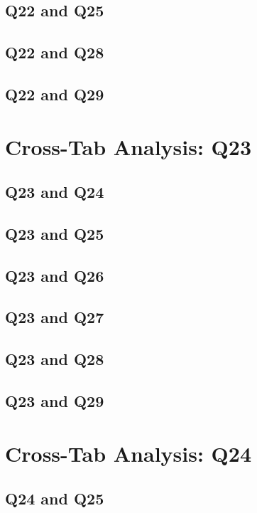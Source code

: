 \documentclass{report}
\begin{document}
\section{Q22 and Q25}\clearpage
\section{Q22 and Q28}\clearpage
\section{Q22 and Q29}\clearpage

\chapter{Cross-Tab Analysis: Q23}

\section{Q23 and Q24}\clearpage
\section{Q23 and Q25}\clearpage
\section{Q23 and Q26}\clearpage
\section{Q23 and Q27}\clearpage
\section{Q23 and Q28}\clearpage
\section{Q23 and Q29}\clearpage

\chapter{Cross-Tab Analysis: Q24}

\section{Q24 and Q25}\clearpage
\end{document}
